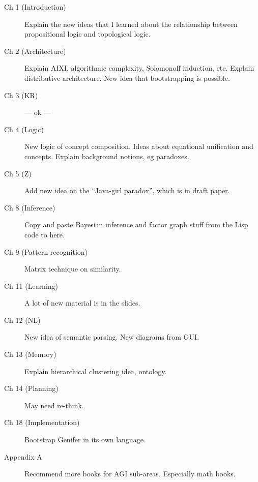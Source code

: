 \documentclass[12pt, UTF8, a4paper]{report}
\theoremstyle{examples} \newtheorem{example}{Example}[section]
\begin{document}
\begin{description}

\item[Ch 1 (Introduction)]  Explain the new ideas that I learned about the relationship between propositional logic and topological logic.

\item[Ch 2 (Architecture)]  Explain AIXI, algorithmic complexity, Solomonoff induction, etc.  Explain distributive architecture.  New idea that bootstrapping is possible.

\item[Ch 3 (KR)] --- ok ---

\item[Ch 4 (Logic)]  New logic of concept composition.  Ideas about equational unification and concepts.  Explain background notions, eg paradoxes.

\item[Ch 5 (Z)]  Add new idea on the ``Java-girl paradox'', which is in draft paper.

\item[Ch 8 (Inference)]  Copy and paste Bayesian inference and factor graph stuff from the Lisp code to here.

\item[Ch 9 (Pattern recognition)]  Matrix technique on similarity.

\item[Ch 11 (Learning)]  A lot of new material is in the slides.

\item[Ch 12 (NL)] New idea of semantic parsing.  New diagrams from GUI.

\item[Ch 13 (Memory)]  Explain hierarchical clustering idea, ontology.

\item[Ch 14 (Planning)]  May need re-think.

\item[Ch 18 (Implementation)]  Bootstrap Genifer in its own language.

\item[Appendix A]  Recommend more books for AGI sub-areas.  Especially math books.

\end{description}

\color{black}

\tableofcontents






















\end{document}

